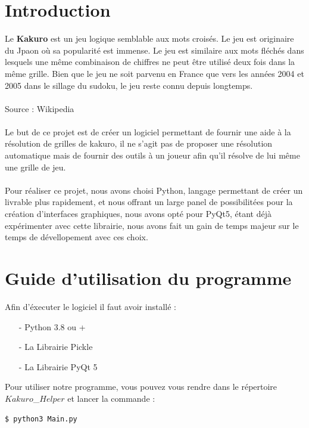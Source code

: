 \documentclass[french,12pt]{article}
\begin{document}
\thispagestyle{empty}
\setcounter{page}{0}
\newpage
\renewcommand{\contentsname}{Table des matières}
\tableofcontents
\newpage


\section{Introduction}
Le \textbf{Kakuro} est un jeu logique semblable aux mots croisés. Le jeu est originaire du Jpaon où sa popularité est immense. Le jeu est similaire aux mots fléchés dans lesquels une même combinaison de chiffres ne peut être utilisé deux fois dans la même grille. Bien que le jeu ne soit parvenu en France que vers les années 2004 et 2005 dans le sillage du sudoku, le jeu reste connu depuis longtemps. \\ \\ Source : Wikipedia \\ \\
Le but de ce projet est de créer un logiciel permettant de fournir une aide à la résolution de grilles de kakuro, il ne s'agit pas de proposer une résolution automatique mais de fournir des outils à un joueur afin qu'il résolve de lui même une grille de jeu. \\\ \\
Pour réaliser ce projet, nous avons choisi Python, langage permettant de créer un livrable plus rapidement, et nous offrant un large panel de possibilitées pour la création d'interfaces graphiques, nous avons opté pour PyQt5, étant déjà expérimenter avec cette librairie, nous avons fait un gain de temps majeur sur le temps de dévellopement avec ces choix.
\section{Guide d'utilisation du programme}
Afin d'éxecuter le logiciel il faut avoir installé :
\begin{enumerate}
\item[-] Python 3.8 ou +
\item[-] La Librairie Pickle
\item[-] La Librairie PyQt 5
\end{enumerate} 
Pour utiliser notre programme, vous pouvez vous rendre dans le répertoire $Kakuro$\_$Helper$ et lancer la commande :
\begin{lstlisting}[language=bash]
  $ python3 Main.py
\end{lstlisting}


\newpage
\end{document}
